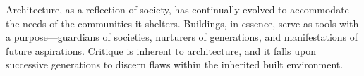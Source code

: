 







Architecture, as a reflection of society, has continually evolved to accommodate the needs of the communities it shelters.
Buildings, in essence, serve as tools with a purpose—guardians of societies, nurturers of generations, and manifestations of future aspirations.
Critique is inherent to architecture, and it falls upon successive generations to discern flaws within the inherited built environment.

